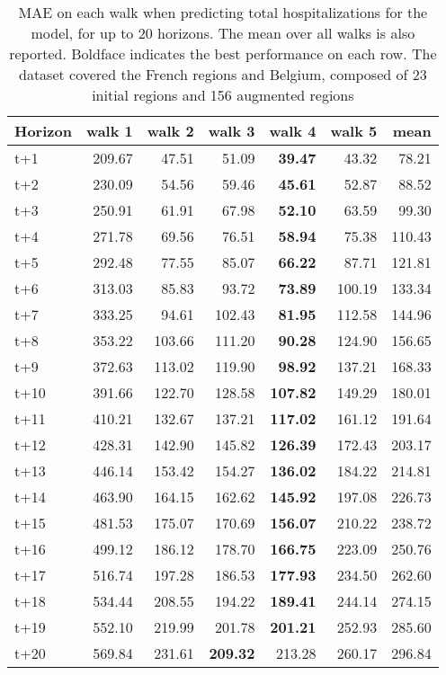 \begin{table}[H]
\centering
\caption{MAE on each walk when predicting total hospitalizations for the model, for up to 20 horizons. The mean over all walks is also reported. Boldface indicates the best performance on each row. The dataset covered the French regions and Belgium, composed of 23 initial regions and 156 augmented regions }
\label{tab:MAE_walk_custom_linear_regression}
\begin{tabular}{lrrrrrr}
\toprule
Horizon &  walk 1 &  walk 2 &  walk 3 &  walk 4 &  walk 5 &   mean \\
\midrule
t+1  & 209.67  & 47.51  & 51.09  & \textbf{39.47}  & 43.32  & 78.21  \\
t+2  & 230.09  & 54.56  & 59.46  & \textbf{45.61}  & 52.87  & 88.52  \\
t+3  & 250.91  & 61.91  & 67.98  & \textbf{52.10}  & 63.59  & 99.30  \\
t+4  & 271.78  & 69.56  & 76.51  & \textbf{58.94}  & 75.38  & 110.43  \\
t+5  & 292.48  & 77.55  & 85.07  & \textbf{66.22}  & 87.71  & 121.81  \\
t+6  & 313.03  & 85.83  & 93.72  & \textbf{73.89}  & 100.19  & 133.34  \\
t+7  & 333.25  & 94.61  & 102.43  & \textbf{81.95}  & 112.58  & 144.96  \\
t+8  & 353.22  & 103.66  & 111.20  & \textbf{90.28}  & 124.90  & 156.65  \\
t+9  & 372.63  & 113.02  & 119.90  & \textbf{98.92}  & 137.21  & 168.33  \\
t+10  & 391.66  & 122.70  & 128.58  & \textbf{107.82}  & 149.29  & 180.01  \\
t+11  & 410.21  & 132.67  & 137.21  & \textbf{117.02}  & 161.12  & 191.64  \\
t+12  & 428.31  & 142.90  & 145.82  & \textbf{126.39}  & 172.43  & 203.17  \\
t+13  & 446.14  & 153.42  & 154.27  & \textbf{136.02}  & 184.22  & 214.81  \\
t+14  & 463.90  & 164.15  & 162.62  & \textbf{145.92}  & 197.08  & 226.73  \\
t+15  & 481.53  & 175.07  & 170.69  & \textbf{156.07}  & 210.22  & 238.72  \\
t+16  & 499.12  & 186.12  & 178.70  & \textbf{166.75}  & 223.09  & 250.76  \\
t+17  & 516.74  & 197.28  & 186.53  & \textbf{177.93}  & 234.50  & 262.60  \\
t+18  & 534.44  & 208.55  & 194.22  & \textbf{189.41}  & 244.14  & 274.15  \\
t+19  & 552.10  & 219.99  & 201.78  & \textbf{201.21}  & 252.93  & 285.60  \\
t+20  & 569.84  & 231.61  & \textbf{209.32}  & 213.28  & 260.17  & 296.84  \\

\bottomrule
\end{tabular}
\end{table}
